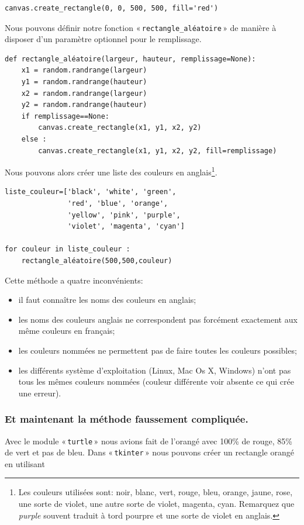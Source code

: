 \begin{Verbatim}[frame=single,rulecolor=\color{gray}, label=exemple]
canvas.create_rectangle(0, 0, 500, 500, fill='red')
\end{Verbatim}

Nous pouvons définir notre fonction « \texttt{rectangle\_aléatoire} »  de manière à disposer d'un paramètre optionnel pour le remplissage.

\begin{Verbatim}[frame=single,rulecolor=\color{mbleu}, label=à taper]
def rectangle_aléatoire(largeur, hauteur, remplissage=None):
    x1 = random.randrange(largeur)
    y1 = random.randrange(hauteur)
    x2 = random.randrange(largeur)
    y2 = random.randrange(hauteur)
    if remplissage==None:
        canvas.create_rectangle(x1, y1, x2, y2)
    else :	
        canvas.create_rectangle(x1, y1, x2, y2, fill=remplissage)
\end{Verbatim}

Nous pouvons alors créer une liste des couleurs en anglais\footnote{Les couleurs utilisées sont: noir, blanc, vert, rouge, bleu, orange, jaune, rose, une sorte de violet, une autre sorte de violet, magenta, cyan. Remarquez que \emph{purple} souvent traduit à tord pourpre et une sorte de violet en anglais.}. 

\begin{Verbatim}[frame=single,rulecolor=\color{mbleu}, label=à taper]
liste_couleur=['black', 'white', 'green',
               'red', 'blue', 'orange',
               'yellow', 'pink', 'purple',
               'violet', 'magenta', 'cyan']

for couleur in liste_couleur :
	rectangle_aléatoire(500,500,couleur)
\end{Verbatim}

Cette méthode a quatre inconvénients: 
\begin{itemize}
\item il faut connaître les noms des couleurs en anglais;
\item les noms des couleurs anglais ne correspondent pas forcément exactement aux même couleurs en français;
\item les couleurs nommées ne permettent pas de faire toutes les couleurs possibles;
\item les différents système d'exploitation (Linux, Mac Os X, Windows) n'ont pas tous les mêmes couleurs nommées (couleur différente voir absente ce qui crée une erreur).
\end{itemize}
\subsubsection*{Et maintenant la méthode faussement compliquée.}
Avec le module « \texttt{turtle} » nous avions fait de l'orangé avec 100\% de rouge, 85\% de vert et pas de bleu. Dans « \texttt{tkinter} » nous pouvons créer un rectangle orangé en utilisant

